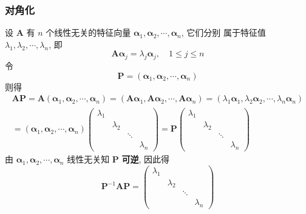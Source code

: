 \documentclass{article}
\begin{document}
			\subsubsection{对角化}
				设 $\boldsymbol{A}$ 有 $n$ 个线性无关的特征向量 $\boldsymbol{\alpha}_{1}, \boldsymbol{\alpha}_{2}, \cdots, \boldsymbol{\alpha}_{n}$, 它们分别 属于特征值 $\lambda_{1}, \lambda_{2}, \cdots, \lambda_{n}$, 即
				$$
				\boldsymbol{A} \boldsymbol{\alpha}_{j}=\lambda_{j} \boldsymbol{\alpha}_{j}, \quad 1 \leqslant j \leqslant n
				$$
				令
				$$
				\boldsymbol{P}=\left(\boldsymbol{\alpha}_{1}, \boldsymbol{\alpha}_{2}, \cdots, \boldsymbol{\alpha}_{n}\right)
				$$
				则得
				$$
				\begin{gathered}
					\boldsymbol{A P}=\boldsymbol{A}\left(\boldsymbol{\alpha}_{1}, \boldsymbol{\alpha}_{2}, \cdots, \boldsymbol{\alpha}_{n}\right)=\left(\boldsymbol{A} \boldsymbol{\alpha}_{1}, \boldsymbol{A} \boldsymbol{\alpha}_{2}, \cdots, \boldsymbol{A} \boldsymbol{\alpha}_{n}\right)=\left(\lambda_{1} \boldsymbol{\alpha}_{1}, \lambda_{2} \boldsymbol{\alpha}_{2}, \cdots, \lambda_{n} \boldsymbol{\alpha}_{n}\right) \\
					=\left(\boldsymbol{\alpha}_{1}, \boldsymbol{\alpha}_{2}, \cdots, \boldsymbol{\alpha}_{n}\right)\left(\begin{array}{cccc}
						\lambda_{1} & & & \\
						& \lambda_{2} & & \\
						& & \ddots & \\
						& & & \lambda_{n}
					\end{array}\right)=\boldsymbol{P}\left(\begin{array}{lllll}
						\lambda_{1} & & & \\
						& \lambda_{2} & & \\
						& & \ddots & \\
						& & & \lambda_{n}
					\end{array}\right)
				\end{gathered}
				$$
				由 $\boldsymbol{\alpha}_{1}, \boldsymbol{\alpha}_{2}, \cdots, \boldsymbol{\alpha}_{n}$ 线性无关知 $\boldsymbol{P}$ \textbf{可逆}, 因此得
				$$
				\boldsymbol{P}^{-1} \boldsymbol{A P}=\left(\begin{array}{ccccc}
					\lambda_{1} & & & \\
					& \lambda_{2} & & \\
					& & \ddots & \\
					& & & \lambda_{n}
				\end{array}\right)
				$$
\end{document}
